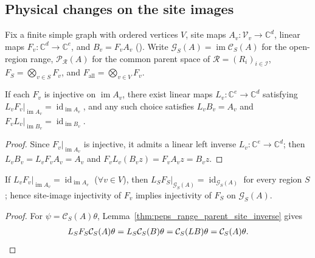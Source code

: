 \subsection{Physical changes on the site images}
\label{sec:peps_range_parent_transport}

Fix a finite simple graph with ordered vertices $V$, site maps $A_v:\mathcal V_v\to\mathbb C^d$, linear maps $F_v:\mathbb C^d\to\mathbb C^e$, and $B_v=F_vA_v$ (\cite[Definition~5.1]{Schuch2010PEPS}).
Write $\mathcal G_S(A)=\operatorname{im}\mathcal C_S(A)$ for the open-region range, $\mathcal P_{\mathcal R}(A)$ for the common parent space of $\mathcal R=(R_i)_{i\in\mathcal I}$, $F_S=\bigotimes_{v\in S}F_v$, and $F_{\mathrm{all}}=\bigotimes_{v\in V}F_v$.

\begin{lemma}%
    \label{thm:peps_range_parent_site_inverse}
    \leanok
    If each $F_v$ is injective on $\operatorname{im}A_v$, there exist linear maps $L_v:\mathbb C^e\to\mathbb C^d$ satisfying $L_vF_v|_{\operatorname{im}A_v}=\operatorname{id}_{\operatorname{im}A_v}$, and any such choice satisfies $L_vB_v=A_v$ and $F_vL_v|_{\operatorname{im}B_v}=\operatorname{id}_{\operatorname{im}B_v}$.
\end{lemma}
\begin{proof}\leanok
    Since $F_v|_{\operatorname{im}A_v}$ is injective, it admits a linear left inverse $L_v:\mathbb C^e\to\mathbb C^d$; then $L_vB_v=L_vF_vA_v=A_v$ and $F_vL_v(B_vz)=F_vA_vz=B_vz$.
\end{proof}

\begin{lemma}%
    \label{thm:peps_range_parent_regional_inverse}
    \leanok
    If $L_vF_v|_{\operatorname{im}A_v}=\operatorname{id}_{\operatorname{im}A_v}$ ($\forall v\in V$), then $L_SF_S|_{\mathcal G_S(A)}=\operatorname{id}_{\mathcal G_S(A)}$ for every region $S$; hence site-image injectivity of $F_v$ implies injectivity of $F_S$ on $\mathcal G_S(A)$.
\end{lemma}
\begin{proof}\leanok
    For $\psi=\mathcal C_S(A)\theta$, Lemma~\ref{thm:peps_range_parent_site_inverse} gives
    \begin{align}
        L_SF_S\mathcal C_S(A)\theta
        =L_S\mathcal C_S(B)\theta
        =\mathcal C_S(LB)\theta
        =\mathcal C_S(A)\theta. \notag
    \end{align}
\end{proof}

